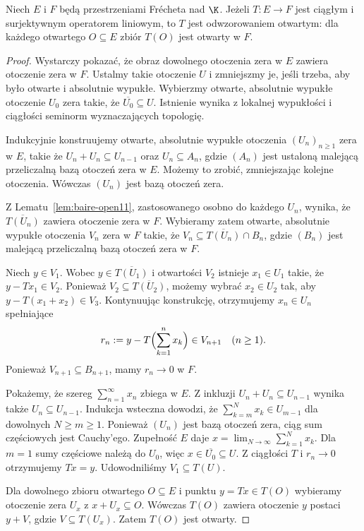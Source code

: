 \begin{twierdzenie}\label{thm:open-mapping11}
Niech $E$ i $F$ będą przestrzeniami Frécheta nad $\K$.
Jeżeli $T:E\to F$ jest ciągłym i surjektywnym
operatorem liniowym, to $T$ jest odwzorowaniem otwartym:
dla każdego otwartego $O\subseteq E$ zbiór $T(O)$
jest otwarty w $F$.
\end{twierdzenie}
\begin{proof}
Wystarczy pokazać, że obraz dowolnego otoczenia zera
w $E$ zawiera otoczenie zera w $F$. Ustalmy takie
otoczenie $U$ i zmniejszmy je, jeśli trzeba, aby było
otwarte i absolutnie wypukłe. Wybierzmy otwarte,
absolutnie wypukłe otoczenie $U_0$ zera takie, że
$\overline{U_0}\subseteq U$. Istnienie wynika z lokalnej
wypukłości i ciągłości seminorm wyznaczających topologię.

Indukcyjnie konstruujemy otwarte, absolutnie wypukłe
otoczenia $(U_n)_{n\ge1}$ zera w $E$, takie że
$U_n+U_n\subseteq U_{n-1}$ oraz $U_n\subseteq A_n$,
gdzie $(A_n)$ jest ustaloną malejącą przeliczalną bazą
otoczeń zera w $E$. Możemy to zrobić, zmniejszając
kolejne otoczenia. Wówczas $(U_n)$ jest bazą otoczeń zera.

Z Lematu~\ref{lem:baire-open11}, zastosowanego osobno
do każdego $U_n$, wynika, że
$\overline{T(U_n)}$ zawiera otoczenie zera w $F$.
Wybieramy zatem otwarte, absolutnie wypukłe otoczenia
$V_n$ zera w $F$ takie, że
$V_n\subseteq\overline{T(U_n)}\cap B_n$, gdzie $(B_n)$
jest malejącą przeliczalną bazą otoczeń zera w $F$.

Niech $y\in V_1$. Wobec $y\in\overline{T(U_1)}$
i otwartości $V_2$ istnieje $x_1\in U_1$ takie, że
$y-Tx_1\in V_2$. Ponieważ $V_2\subseteq\overline{T(U_2)}$,
możemy wybrać $x_2\in U_2$ tak, aby
$y-T(x_1+x_2)\in V_3$. Kontynuując konstrukcję,
otrzymujemy $x_n\in U_n$ spełniające
\[
 r_n:=y-T\Bigl(\sum_{k=1}^n x_k\Bigr)\in V_{n+1}
 \quad (n\ge1).
\]
Ponieważ $V_{n+1}\subseteq B_{n+1}$, mamy $r_n\to0$ w $F$.

Pokażemy, że szereg $\sum_{n=1}^\infty x_n$ zbiega w $E$.
Z inkluzji $U_n+U_n\subseteq U_{n-1}$ wynika także
$U_n\subseteq U_{n-1}$. Indukcja wsteczna dowodzi, że
$\sum_{k=m}^N x_k\in U_{m-1}$ dla dowolnych $N\ge m\ge1$.
Ponieważ $(U_n)$ jest bazą otoczeń zera, ciąg sum częściowych
jest Cauchy'ego. Zupełność $E$ daje
$x=\lim_{N\to\infty}\sum_{k=1}^N x_k$.
Dla $m=1$ sumy częściowe należą do $U_0$, więc
$x\in\overline{U_0}\subseteq U$. Z ciągłości $T$ i
$r_n\to0$ otrzymujemy $Tx=y$. Udowodniliśmy
$V_1\subseteq T(U)$.

Dla dowolnego zbioru otwartego $O\subseteq E$ i punktu
$y=Tx\in T(O)$ wybieramy otoczenie zera $U_x$ z
$x+U_x\subseteq O$. Wówczas $T(O)$ zawiera otoczenie
$y$ postaci $y+V$, gdzie $V\subseteq T(U_x)$.
Zatem $T(O)$ jest otwarty.
\end{proof}

